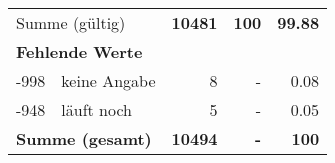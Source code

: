 \begin{longtable}{lXrrr}
     \midrule
     \multicolumn{2}{l}{Summe (gültig)} &
       \textbf{\num{10481}} &
     \textbf{\num{100}} &
       \textbf{\num[round-mode=places,round-precision=2]{99.88}} \\
     \multicolumn{5}{l}{\textbf{Fehlende Werte}}\\
       -998 &
       keine Angabe &
         \num{8} &
        - &
         \num[round-mode=places,round-precision=2]{0.08} \\
       -948 &
       läuft noch &
         \num{5} &
        - &
         \num[round-mode=places,round-precision=2]{0.05} \\
     \midrule
     \multicolumn{2}{l}{\textbf{Summe (gesamt)}} &
          \textbf{\num{10494}} &
        \textbf{-} &
        \textbf{\num{100}} \\
     \bottomrule
     \end{longtable}
     
